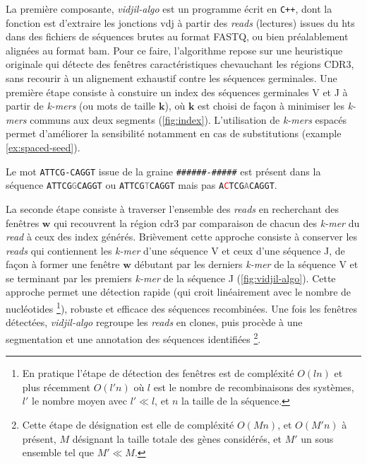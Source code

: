 La première composante, \textit{vidjil-algo} est un programme écrit en
\texttt{C++}, dont la fonction est d'extraire les jonctions \gls{vdj} à partir
des \textit{reads} (lectures) issues du \gls{hts} dans des fichiers de
séquences brutes au format FASTQ, ou bien préalablement alignées au format
\gls{bam}. Pour ce faire, l'algorithme repose sur une heuristique originale qui
détecte des fenêtres caractéristiques chevauchant les régions CDR3, sans
recourir à un alignement exhaustif contre les séquences germinales. Une
première étape consiste à constuire un index des séquences germinales V et J à
partir de \textit{k-mers} (ou mots de taille $\mathbf{k}$), où $\mathbf{k}$ est
choisi de façon à minimiser les \textit{k-mers} communs aux deux segments
(\autoref{fig:index}). L'utilisation de \textit{k-mers} espacés permet
d'améliorer la sensibilité notamment en cas de substitutions (example
\ref{ex:spaced-seed}).

\begin{examplebox}[label={ex:spaced-seed}]
    Le mot \texttt{ATTCG-CAGGT} issue de la graine \texttt{\#\#\#\#\#\#-\#\#\#\#\#}
    est présent dans la séquence \texttt{ATTCG\textcolor{gray}{G}CAGGT} ou \texttt{ATTCG\textcolor{gray}{T}CAGGT}
    mais pas \texttt{A\textcolor{red}{C}TCG\textcolor{gray}{A}CAGGT}.
\end{examplebox}



La seconde étape consiste à traverser l'ensemble des \textit{reads} en
recherchant des fenêtres $\mathbf{w}$ qui recouvrent la région \gls{cdr}3 par
comparaison de chacun des \textit{k-mer} du \textit{read} à ceux des index
générés. Brièvement cette approche consiste à conserver les \textit{reads} qui
contiennent les \textit{k-mer} d'une séquence V et ceux d'une séquence J, de
façon à former une fenêtre $\mathbf{w}$ débutant par les derniers
\textit{k-mer} de la séquence V et se terminant par les premiers \textit{k-mer}
de la séquence J (\autoref{fig:vidjil-algo}). Cette approche permet une
détection rapide (qui croit linéairement avec le nombre de nucléotides
\footnote{En pratique l'étape de détection des fenêtres est de compléxité
$O(ln)$ et plus récemment $O(l'n)$ où $l$ est le nombre de recombinaisons des
systèmes, $l'$ le nombre moyen avec $l' \ll l$, et $n$ la taille de la
séquence.}), robuste et efficace des séquences recombinées. Une fois les
fenêtres détectées, \textit{vidjil-algo} regroupe les \textit{reads} en clones,
puis procède à une segmentation et une annotation des séquences identifiées
\footnote{Cette étape de désignation est elle de compléxité $O(Mn)$, et
$O(M'n)$ à présent, $M$ désignant la taille totale des gènes considérés, et
$M'$ un sous ensemble tel que $M' \ll M$.}.

